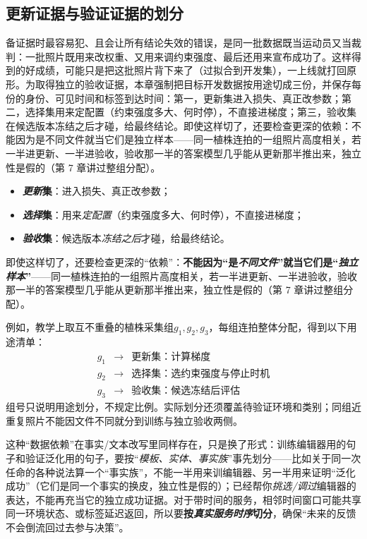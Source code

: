 \subsection{更新证据与验证证据的划分}
\label{sec:ket-update-split}

备证据时最容易犯、且会让所有结论失效的错误，是同一批数据既当运动员又当裁判：一批照片既用来改权重、又用来调约束强度、最后还用来宣布成功了。这样得到的好成绩，可能只是把这批照片背下来了（过拟合到开发集），一上线就打回原形。为取得独立的验收证据，本章强制把目标开发数据按用途切成三份，并保存每份的身份、可见时间和标签到达时间：第一，更新集进入损失、真正改参数；第二，选择集用来定配置（约束强度多大、何时停），不直接进梯度；第三，验收集在候选版本冻结之后才碰，给最终结论。即使这样切了，还要检查更深的依赖：不能因为是不同文件就当它们是独立样本——同一植株连拍的一组照片高度相关，若一半进更新、一半进验收，验收那一半的答案模型几乎能从更新那半推出来，独立性是假的（第 7 章讲过整组分配）。
\begin{itemize}\item \textbf{\emph{更新}集}：进入损失、真正改参数；\item \textbf{\emph{选择}集}：用来\emph{定配置}（约束强度多大、何时停），不直接进梯度；\item \textbf{\emph{验收}集}：候选版本\emph{冻结之后}才碰，给最终结论。\end{itemize}
即使这样切了，还要检查更深的“依赖”：\textbf{不能因为“是\emph{不同文件}”就当它们是“\emph{独立样本}”}——同一植株连拍的一组照片高度相关，若一半进更新、一半进验收，验收那一半的答案模型几乎能从更新那半推出来，独立性是假的（第 7 章讲过整组分配）。

例如，教学上取互不重叠的植株采集组$g_1,g_2,g_3$，每组连拍整体分配，得到以下用途清单：
\[
\begin{array}{ccl}
g_1&\longrightarrow&\text{更新集：计算梯度}\\
g_2&\longrightarrow&\text{选择集：选约束强度与停止时机}\\
g_3&\longrightarrow&\text{验收集：候选冻结后评估}
\end{array}
\]
组号只说明用途划分，不规定比例。实际划分还须覆盖待验证环境和类别；同组近重复照片不能因文件不同就分到训练与独立验收两侧。

这种“数据依赖”在事实/文本改写里同样存在，只是换了形式：训练编辑器用的句子和验证泛化用的句子，要按“\emph{模板、实体、事实\emph{族}}”事先划分——比如关于同一次任命的各种说法算一个“事实族”，不能一半用来训编辑器、另一半用来证明“泛化成功”（它们是同一个事实的换皮，独立性是假的）；已经帮你\emph{挑选/调过}编辑器的表达，不能再充当它的独立成功证据。对于带时间的服务，相邻时间窗口可能共享同一环境状态、或标签延迟返回，所以要\textbf{按\emph{真实服务时序}切分}，确保“未来的反馈不会倒流回过去参与决策”。

